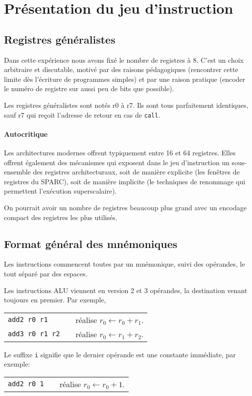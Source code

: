 \documentclass[architecture]{compas2018}
\begin{document}
\section{Présentation du jeu d'instruction}
\subsection{Registres généralistes}
Dans cette expérience nous avons fixé le nombre de registres à 8.
C'est un choix arbitraire et discutable, motivé par des raisons pédagogiques (rencontrer cette limite dès l'écriture de programmes simples) et par une raison pratique (encoder le numéro de registre sur aussi peu de bits que possible).

Les registres généralistes sont notés r0 à r7.
Ils sont tous parfaitement identiques, sauf r7 qui reçoit l'adresse de retour en cas de \texttt{call}.

\paragraph{Autocritique} Les architectures modernes offrent typiquement entre 16 et 64 registres.
Elles offrent également des mécanismes qui exposent dans le jeu d'instruction un sous-ensemble des registres architecturaux, soit de manière explicite (les fenêtres de registres du SPARC), soit de manière implicite (le techniques de renommage qui permettent l'exécution superscalaire).

On pourrait avoir un nombre de registres beaucoup plus grand avec un encodage compact des registres les plus utilisés.

\subsection{Format général des mnémoniques}
Les instructions commencent toutes par un mnémonique, suivi des opérandes, le tout séparé par des espaces.

Les instructions ALU viennent en version 2 et 3 opérandes, la destination venant toujours en premier.
Par exemple, \\
 \begin{tabular}{lcl}
 \texttt{add2 r0 r1}&& réalise $r_0 \leftarrow r_0+r_1$. \\
 \texttt{add3 r0 r1 r2}&& réalise $r_0 \leftarrow r_1+r_2$.
 \end{tabular}
 
Le suffixe \texttt{i} signifie que le dernier opérande est une constante immédiate, par exemple:\\
 \begin{tabular}{lcl}
 \texttt{add2 r0 1}&& réalise $r_0 \leftarrow r_0+1$. \\
 \end{tabular}
\end{document}
